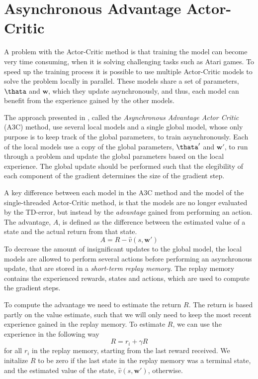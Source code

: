 \documentclass[11pt]{article}
\begin{document}

\section{Asynchronous Advantage Actor-Critic}\label{sec:a3c}

A problem with the Actor-Critic method is that training the model can become very time consuming,
when it is solving challenging tasks such as Atari games.
To speed up the training process it is possible to use 
multiple Actor-Critic models to 
solve the problem locally in parallel.
These models share a set of parameters, $\thata$ and $\mathbf{w}$, which they update asynchronously,
and thus, each model can benefit from the experience gained by the other models.

The approach presented in \cite{a3c}, called the \textit{Asynchronous Advantage Actor Critic} (A3C) method,
use several local models and a single global model, whose only purpose is to keep track of the global parameters,
to train asynchronously.
Each of the local models use a copy of the global parameters, $\thata'$ and $\mathbf{w}'$, to run through a problem
and update the global parameters based on the local experience.
The global update should be performed such that
the elegibility of each component of the gradient determines the size of the
gradient step.

A key difference between each model in the A3C method and the model of the single-threaded Actor-Critic method,
is that the models are no longer evaluated by the TD-error,
but instead by the \textit{advantage} gained from performing an action.
The advantage, $A$, is defined as the difference between the estimated value of
a state and the actual return from that state.
\begin{equation}
    A = R - \hat{v}(s, \mathbf{w}')
\end{equation}
To decrease the amount of insignificant updates to the global
model, the local models are allowed to perform several actions
before performing an asynchronous update, that are stored in a \textit{short-term
replay memory}.
The replay memory contains the experienced rewards, states and actions,
which are used to compute the gradient steps.

To compute the advantage we need to estimate the return $R$.
The return is based partly on the value estimate, such that we will only
need to keep the most recent experience gained in the replay memory.
To estimate $R$, we can use the experience in the following way
\begin{equation}
    R = r_i + \gamma R
\end{equation}
for all $r_i$ in the replay memory, starting from the last reward received.
We initalize $R$ to be zero if the last state in the replay memory was a terminal state,
and the estimated value of the state, $\hat{v}(s, \mathbf{w}')$, otherwise.
\end{document}
